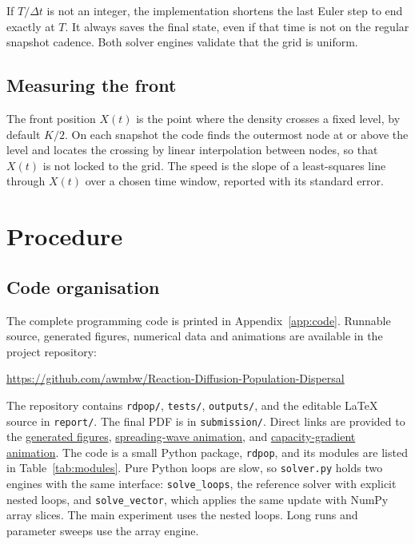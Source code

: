 \documentclass[11pt,a4paper]{article}
\newcommand{\code}[1]{\texttt{\small #1}}
\begin{document}
If $T/\Delta t$ is not an integer, the implementation shortens the last Euler step
to end exactly at $T$. It always saves the final state, even if that time is not on
the regular snapshot cadence. Both solver engines validate that the grid is uniform.

\subsection{Measuring the front}
The front position $X(t)$ is the point where the density crosses a fixed level, by default $K/2$. On
each snapshot the code finds the outermost node at or above the level and locates the crossing
by linear interpolation between nodes, so that $X(t)$ is not locked to the grid. The speed is the
slope of a least-squares line through $X(t)$ over a chosen time window, reported with its standard error.

\clearpage
\section{Procedure}\label{sec:procedure}

\subsection{Code organisation}
The complete programming code is printed in Appendix~\ref{app:code}. Runnable source,
generated figures, numerical data and animations are available in the project repository:
\begin{center}\small
\url{https://github.com/awmbw/Reaction-Diffusion-Population-Dispersal}
\end{center}
The repository contains \code{rdpop/}, \code{tests/}, \code{outputs/}, and the editable
LaTeX source in \code{report/}. The final PDF is in \code{submission/}.
Direct links are provided to the
\href{https://github.com/awmbw/Reaction-Diffusion-Population-Dispersal/tree/main/outputs/figures}{generated figures},
\href{https://github.com/awmbw/Reaction-Diffusion-Population-Dispersal/blob/main/outputs/animations/wave_spreading.gif}{spreading-wave animation}, and
\href{https://github.com/awmbw/Reaction-Diffusion-Population-Dispersal/blob/main/outputs/animations/capacity_gradient.gif}{capacity-gradient animation}.
The code is a small Python package, \code{rdpop}, and its modules are listed in
Table~\ref{tab:modules}. Pure Python loops are slow, so \code{solver.py} holds two engines with the same
interface: \code{solve\_loops}, the reference solver with explicit nested loops, and \code{solve\_vector},
which applies the same update with NumPy array slices. The main experiment uses the nested
loops. Long runs and parameter sweeps use the array engine.
\end{document}
